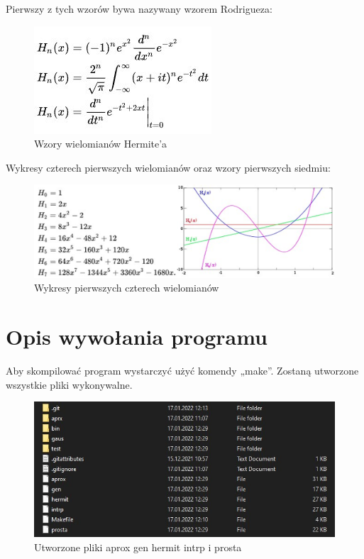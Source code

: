 \documentclass[10pt, a4paper]{report}
\begin{document}
    Pierwszy z tych wzorów bywa nazywany wzorem Rodrigueza:
    \begin{figure}[h]
        \begin{center}
            \includegraphics[scale=0.8]{hermit3.jpg}
            \caption{Wzory wielomianów Hermite'a}
        \end{center}
    \end{figure}
    Wykresy czterech pierwszych wielomianów oraz wzory pierwszych siedmiu:
    \begin{figure}[h]
        \begin{center}
            \includegraphics[scale=0.8]{hermit4.png}
            \caption{Wykresy pierwszych czterech wielomianów}
        \end{center}
    \end{figure}
    \newpage

    \section{Opis wywołania programu}
    Aby skompilować program wystarczyć użyć komendy „make”. Zostaną utworzone wszystkie pliki wykonywalne.
    \begin{figure}[h]
        \begin{center}
            \includegraphics[scale=0.8]{run1.jpg}
            \caption{Utworzone pliki aprox gen hermit intrp i prosta }
        \end{center}
    \end{figure}
\end{document}
